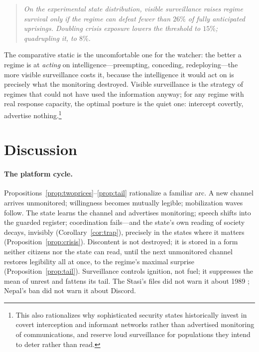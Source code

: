 \documentclass[11pt]{article}
\theoremstyle{remark}
\begin{document}
\begin{quote}
\emph{On the experimental state distribution, visible surveillance raises regime survival only if the regime can defeat fewer than $26\%$ of fully anticipated uprisings. Doubling crisis exposure lowers the threshold to $15\%$; quadrupling it, to $8\%$.}
\end{quote}

The comparative static is the uncomfortable one for the watcher: the better a regime is at \emph{acting} on intelligence---preempting, conceding, redeploying---the more visible surveillance costs it, because the intelligence it would act on is precisely what the monitoring destroyed. Visible surveillance is the strategy of regimes that could not have used the information anyway; for any regime with real response capacity, the optimal posture is the quiet one: intercept covertly, advertise nothing.\footnote{This also rationalizes why sophisticated security states historically invest in covert interception and informant networks rather than advertised monitoring of communications, and reserve loud surveillance for populations they intend to deter rather than read.}

\section{Discussion}\label{sec:discussion}

\paragraph{The platform cycle.} Propositions~\ref{prop:twoprices}--\ref{prop:tail} rationalize a familiar arc. A new channel arrives unmonitored; willingness becomes mutually legible; mobilization waves follow. The state learns the channel and advertises monitoring; speech shifts into the guarded register; coordination fails---and the state's own reading of society decays, invisibly (Corollary~\ref{cor:trap}), precisely in the states where it matters (Proposition~\ref{prop:crisis}). Discontent is not destroyed; it is stored in a form neither citizens nor the state can read, until the next unmonitored channel restores legibility all at once, to the regime's maximal surprise (Proposition~\ref{prop:tail}). Surveillance controls ignition, not fuel; it suppresses the mean of unrest and fattens its tail. The Stasi's files did not warn it about 1989 \citep{kuran1991}; Nepal's ban did not warn it about Discord.
\end{document}
